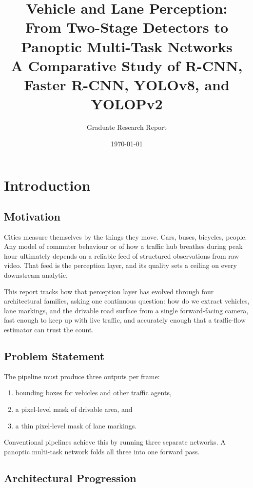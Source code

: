 \documentclass[12pt,a4paper]{report}
\title{\textbf{Vehicle and Lane Perception:\\
From Two-Stage Detectors to Panoptic Multi-Task Networks}\\[0.4em]
\large A Comparative Study of R-CNN, Faster R-CNN, YOLOv8, and YOLOPv2}
\author{Graduate Research Report}
\date{\today}
\begin{document}
\maketitle
\tableofcontents
\listoffigures
\listoftables


\chapter{Introduction}

\section{Motivation}

Cities measure themselves by the things they move. Cars, buses, bicycles, people. Any model of commuter behaviour or of how a traffic hub breathes during peak hour ultimately depends on a reliable feed of structured observations from raw video. That feed is the perception layer, and its quality sets a ceiling on every downstream analytic.

This report tracks how that perception layer has evolved through four architectural families, asking one continuous question: how do we extract vehicles, lane markings, and the drivable road surface from a single forward-facing camera, fast enough to keep up with live traffic, and accurately enough that a traffic-flow estimator can trust the count.

\section{Problem Statement}

The pipeline must produce three outputs per frame:

\begin{enumerate}[leftmargin=*]
    \item bounding boxes for vehicles and other traffic agents,
    \item a pixel-level mask of drivable area, and
    \item a thin pixel-level mask of lane markings.
\end{enumerate}

Conventional pipelines achieve this by running three separate networks. A panoptic multi-task network folds all three into one forward pass.

\section{Architectural Progression}
\end{document}
